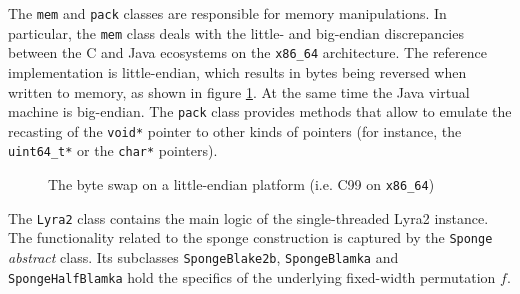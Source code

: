 The \texttt{mem} and \texttt{pack} classes are responsible for memory manipulations. In particular, the \texttt{mem} class deals with the little- and big-endian discrepancies between the C and Java ecosystems on the \texttt{x86\_64} architecture. The reference implementation is little-endian, which results in bytes being reversed when written to memory, as shown in figure \ref{fig:little-endian}. At the same time the Java virtual machine is big-endian. The \texttt{pack} class provides methods that allow to emulate the recasting of the \texttt{void*} pointer to other kinds of pointers (for instance, the \texttt{uint64\_t*} or the \texttt{char*} pointers).

\begin{figure}
    \centering
    \caption{The byte swap on a little-endian platform (i.e. C99 on \texttt{x86\_64})}
    \label{fig:little-endian}
  \end{figure}

The \texttt{Lyra2} class contains the main logic of the single-threaded Lyra2 instance. The functionality related to the sponge construction is captured by the \texttt{Sponge} \emph{abstract} class. Its subclasses \texttt{SpongeBlake2b}, \texttt{SpongeBlamka} and \texttt{SpongeHalfBlamka} hold the specifics of the underlying fixed-width permutation \(f\).

